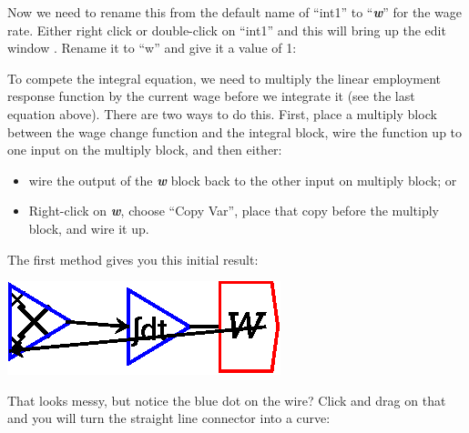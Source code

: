 Now we need to rename this from the default name of ``int1'' to
``{\em\bf w}'' for the wage rate. Either right click or double-click
on ``int1'' and this will bring up the edit window . Rename it to ``w'' and
give it a value of 1: 

\begin{center}
\end{center}

To compete the integral equation, we need to multiply the linear
employment response function by the current wage before we integrate
it (see the last equation above). There are two ways to do
this. First, place a multiply block between the wage change function
and the integral block, wire the function up to one input on the
multiply block, and then either:

\begin{itemize}
\item wire the output of the {\bf\em w} block back to the other input
on multiply block; or
\item Right-click on {\bf\em w}, choose ``Copy Var'', place that copy
before the multiply block, and wire it up.
\end{itemize}

The first method gives you this initial result:

\begin{center}
\includegraphics{images/NewItem110.eps}
\end{center}

That looks messy, but notice the blue dot on the wire? Click and drag
on that and you will turn the straight line connector into a curve: 

\begin{center}
\end{center}

